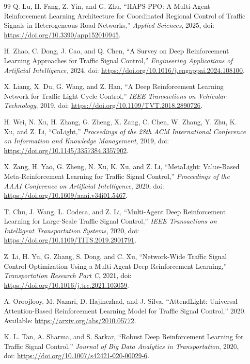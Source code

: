 \begin{thebibliography}{99}
Q. Lu, H. Fang, Z. Yin, and G. Zhu, ``HAPS-PPO: A Multi-Agent Reinforcement Learning Architecture for Coordinated Regional Control of Traffic Signals in Heterogeneous Road Networks,'' \textit{Applied Sciences}, 2025, doi: \url{https://doi.org/10.3390/app152010945}.

H. Zhao, C. Dong, J. Cao, and Q. Chen, ``A Survey on Deep Reinforcement Learning Approaches for Traffic Signal Control,'' \textit{Engineering Applications of Artificial Intelligence}, 2024, doi: \url{https://doi.org/10.1016/j.engappai.2024.108100}.

X. Liang, X. Du, G. Wang, and Z. Han, ``A Deep Reinforcement Learning Network for Traffic Light Cycle Control,'' \textit{IEEE Transactions on Vehicular Technology}, 2019, doi: \url{https://doi.org/10.1109/TVT.2018.2890726}.

H. Wei, N. Xu, H. Zhang, G. Zheng, X. Zang, C. Chen, W. Zhang, Y. Zhu, K. Xu, and Z. Li, ``CoLight,'' \textit{Proceedings of the 28th ACM International Conference on Information and Knowledge Management}, 2019, doi: \url{https://doi.org/10.1145/3357384.3357902}.

X. Zang, H. Yao, G. Zheng, N. Xu, K. Xu, and Z. Li, ``MetaLight: Value-Based Meta-Reinforcement Learning for Traffic Signal Control,'' \textit{Proceedings of the AAAI Conference on Artificial Intelligence}, 2020, doi: \url{https://doi.org/10.1609/aaai.v34i01.5467}.

T. Chu, J. Wang, L. Codeca, and Z. Li, ``Multi-Agent Deep Reinforcement Learning for Large-Scale Traffic Signal Control,'' \textit{IEEE Transactions on Intelligent Transportation Systems}, 2020, doi: \url{https://doi.org/10.1109/TITS.2019.2901791}.

Z. Li, H. Yu, G. Zhang, S. Dong, and C. Xu, ``Network-Wide Traffic Signal Control Optimization Using a Multi-Agent Deep Reinforcement Learning,'' \textit{Transportation Research Part C}, 2021, doi: \url{https://doi.org/10.1016/j.trc.2021.103059}.

A. Oroojlooy, M. Nazari, D. Hajinezhad, and J. Silva, ``AttendLight: Universal Attention-Based Reinforcement Learning Model for Traffic Signal Control,'' 2020. Available: \url{https://arxiv.org/abs/2010.05772}.

K. L. Tan, A. Sharma, and S. Sarkar, ``Robust Deep Reinforcement Learning for Traffic Signal Control,'' \textit{Journal of Big Data Analytics in Transportation}, 2020, doi: \url{https://doi.org/10.1007/s42421-020-00029-6}.


\end{thebibliography}
